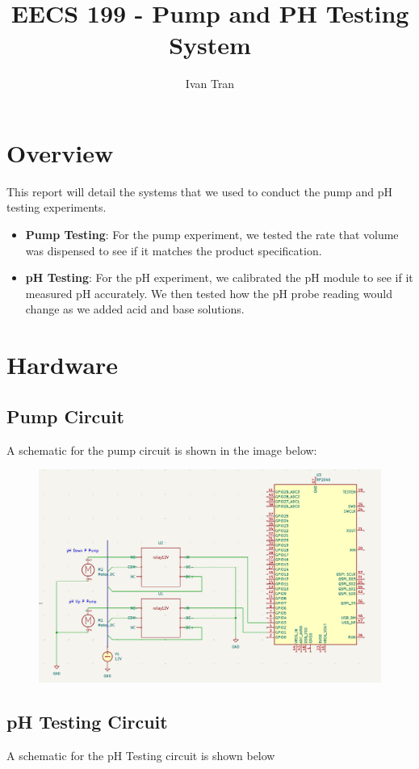 \documentclass{article}
\title{EECS 199 - Pump and PH Testing System}
\author{Ivan Tran}
\date{}
\begin{document}
    \maketitle

    \section{Overview}
        \begin{flushleft}
            This report will detail the systems that we used to conduct the pump and pH testing experiments.
            \begin{itemize}
                \item \textbf{Pump Testing}: For the pump experiment, we tested the rate that volume was dispensed to see if it matches the product specification.
                \item \textbf{pH Testing}: For the pH experiment, we calibrated the pH module to see if it measured pH accurately. We then tested how the pH probe reading would change as we added acid and base solutions.
            \end{itemize}
        \end{flushleft}

    \section{Hardware}
        \subsection{Pump Circuit}
            \begin{flushleft}
                A schematic for the pump circuit is shown in the image below:
                \begin{figure}[!hbt]
                    \centering
                    \includegraphics[width=0.50\linewidth]{assets/pumpCircuitSchematic.png} %
                \end{figure}
            \end{flushleft}
        \subsection{pH Testing Circuit}
            \begin{flushleft}
                A schematic for the pH Testing circuit is shown below
            \end{flushleft}
\end{document}
